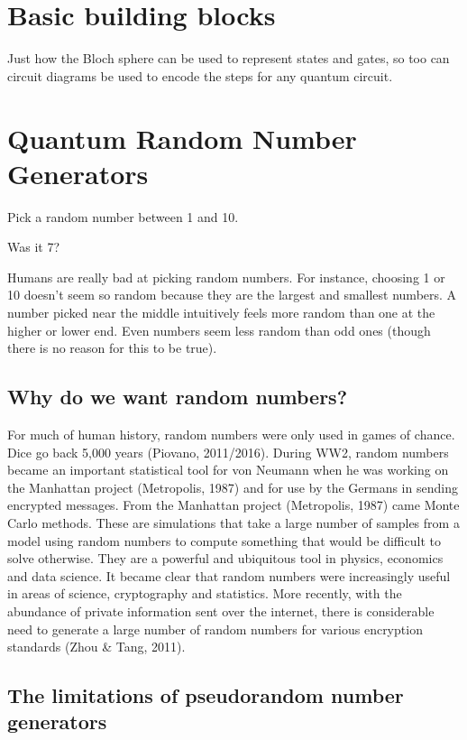 \section{Basic building blocks}

Just how the Bloch sphere can be used to represent states and gates, so too can circuit diagrams be used to encode the steps for any quantum circuit. 

\section{Quantum Random Number Generators}

Pick a random number between 1 and 10. 

Was it 7?    

Humans are really bad at picking random numbers. For instance, choosing 1 or 10 doesn’t seem so random because they are the largest and smallest numbers. A number picked near the middle intuitively feels more random than one at the higher or lower end. Even numbers seem less random than odd ones (though there is no reason for this to be true). 

\subsection{Why do we want random numbers?}

For much of human history, random numbers were only used in games of chance. Dice go back 5,000 years (Piovano, 2011/2016). During WW2, random numbers became an important statistical tool for von Neumann when he was working on the Manhattan project (Metropolis, 1987) and for use by the Germans in sending encrypted messages. 
From the Manhattan project (Metropolis, 1987) came Monte Carlo methods. These are simulations that take a large number of samples from a model using random numbers to compute something that would be difficult to solve otherwise. They are a powerful and ubiquitous tool in physics, economics and data science. It became clear that random numbers were increasingly useful in areas of science, cryptography and statistics. More recently, with the abundance of private information sent over the internet, there is considerable need to generate a large number of random numbers for various encryption standards (Zhou \& Tang, 2011).

\subsection{The limitations of pseudorandom number generators} 


